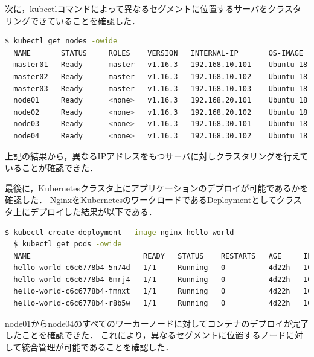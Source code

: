 次に，kubectlコマンドによって異なるセグメントに位置するサーバをクラスタリングできていることを確認した．

\begin{lstlisting}[language=bash]
  $ kubectl get nodes -owide
  NAME       STATUS     ROLES    VERSION   INTERNAL-IP       OS-IMAGE             KERNEL-VERSION      CONTAINER-RUNTIME
  master01   Ready      master   v1.16.3   192.168.10.101    Ubuntu 18.04.3 LTS   4.15.0-70-generic   docker://18.9.7
  master02   Ready      master   v1.16.3   192.168.10.102    Ubuntu 18.04.3 LTS   4.15.0-70-generic   docker://18.9.7
  master03   Ready      master   v1.16.3   192.168.10.103    Ubuntu 18.04.3 LTS   4.15.0-70-generic   docker://18.9.7
  node01     Ready      <none>   v1.16.3   192.168.20.101    Ubuntu 18.04.3 LTS   4.15.0-74-generic   docker://18.9.7
  node02     Ready      <none>   v1.16.3   192.168.20.102    Ubuntu 18.04.3 LTS   4.15.0-74-generic   docker://18.9.7
  node03     Ready      <none>   v1.16.3   192.168.30.101    Ubuntu 18.04.3 LTS   4.15.0-74-generic   docker://18.9.7
  node04     Ready      <none>   v1.16.3   192.168.30.102    Ubuntu 18.04.3 LTS   4.15.0-74-generic   docker://18.9.7
\end{lstlisting}

上記の結果から，異なるIPアドレスをもつサーバに対しクラスタリングを行えていることが確認できた．

最後に，Kubernetesクラスタ上にアプリケーションのデプロイが可能であるかを確認した．
NginxをKubernetesのワークロードであるDeploymentとしてクラスタ上にデプロイした結果が以下である．

\begin{lstlisting}[language=bash]
  $ kubectl create deployment --image nginx hello-world
  $ kubectl get pods -owide
  NAME                          READY   STATUS    RESTARTS   AGE     IP          NODE       NOMINATED NODE   READINESS GATES
  hello-world-c6c6778b4-5n74d   1/1     Running   0          4d22h   10.44.0.1   node01     <none>           <none>
  hello-world-c6c6778b4-6mrj4   1/1     Running   0          4d22h   10.42.0.1   node03     <none>           <none>
  hello-world-c6c6778b4-fmnxt   1/1     Running   0          4d22h   10.47.0.1   node02     <none>           <none>
  hello-world-c6c6778b4-r8b5w   1/1     Running   0          4d22h   10.44.0.2   node04     <none>           <none>
\end{lstlisting}

node01からnode04のすべてのワーカーノードに対してコンテナのデプロイが完了したことを確認できた．
これにより，異なるセグメントに位置するノードに対して統合管理が可能であることを確認した．

